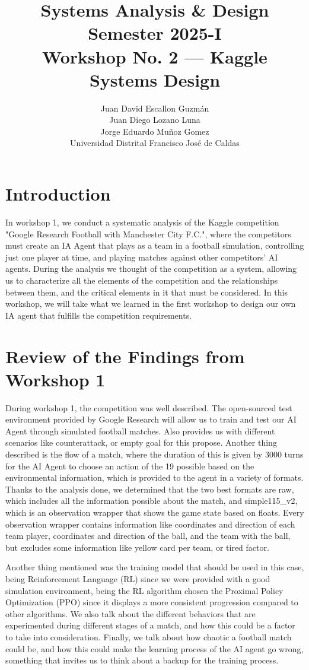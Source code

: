 \documentclass{article}
\title{Systems Analysis \& Design \\ Semester 2025-I \\ Workshop No. 2 — Kaggle Systems Design}
\author{
    Juan David Escallon Guzmán \\
    Juan Diego Lozano Luna \\
    Jorge Eduardo Muñoz Gomez \\
    Universidad Distrital Francisco José de Caldas
}
\date{}
\begin{document}
\maketitle

\section*{Introduction}
In workshop 1, we conduct a systematic analysis of the Kaggle competition "Google Research Football with Manchester City F.C.", where the competitors must create an IA Agent that plays as a team in a football simulation, controlling just one player at time, and playing matches against other competitors' AI agents. During the analysis we thought of the competition as a system, allowing us to characterize all the elements of the competition and the relationships between them, and the critical elements in it that must be considered. In this workshop, we will take what we learned in the first workshop to design our own IA agent that fulfills the competition requirements.

\section*{Review of the Findings from Workshop 1}
During workshop 1, the competition was well described. The open-sourced test environment provided by Google Research will allow us to train and test our AI Agent through simulated football matches. Also provides us with different scenarios like counterattack, or empty goal for this propose. Another thing described is the flow of a match, where the duration of this is given by 3000 turns for the AI Agent to choose an action of the 19 possible based on the environmental information, which is provided to the agent in a variety of formats. Thanks to the analysis done, we determined that the two best formats are raw, which includes all the information possible about the match, and simple115\_v2, which is an observation wrapper that shows the game state based on floats. Every observation wrapper contains information like coordinates and direction of each team player, coordinates and direction of the ball, and the team with the ball, but excludes some information like yellow card per team, or tired factor.

Another thing mentioned was the training model that should be used in this case, being Reinforcement Language (RL) since we were provided with a good simulation environment, being the RL algorithm chosen the Proximal Policy Optimization (PPO) since it displays a more consistent progression compared to other algorithms. We also talk about the different behaviors that are experimented during different stages of a match, and how this could be a factor to take into consideration. Finally, we talk about how chaotic a football match could be, and how this could make the learning process of the AI agent go wrong, something that invites us to think about a backup for the training process.
\end{document}
